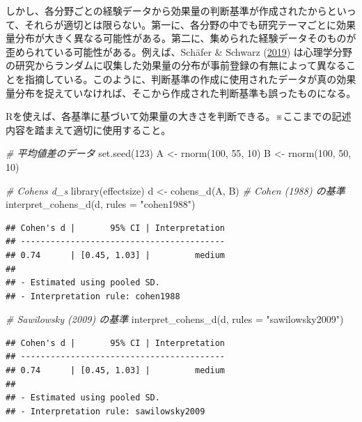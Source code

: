 \documentclass[
  ja=standard, xelatex, base=12pt]{bxjsreport}
\newenvironment{Shaded}{\begin{snugshade}}{\end{snugshade}}
\newcommand{\AttributeTok}[1]{\textcolor[rgb]{0.77,0.63,0.00}{#1}}
\newcommand{\CommentTok}[1]{\textcolor[rgb]{0.56,0.35,0.01}{\textit{#1}}}
\newcommand{\DecValTok}[1]{\textcolor[rgb]{0.00,0.00,0.81}{#1}}
\newcommand{\FunctionTok}[1]{\textcolor[rgb]{0.00,0.00,0.00}{#1}}
\newcommand{\NormalTok}[1]{#1}
\newcommand{\OtherTok}[1]{\textcolor[rgb]{0.56,0.35,0.01}{#1}}
\newcommand{\StringTok}[1]{\textcolor[rgb]{0.31,0.60,0.02}{#1}}
\begin{document}
しかし、各分野ごとの経験データから効果量の判断基準が作成されたからといって、それらが適切とは限らない。第一に、各分野の中でも研究テーマごとに効果量分布が大きく異なる可能性がある。第二に、集められた経験データそのものが歪められている可能性がある。例えば、Schäfer \& Schwarz (\protect\hyperlink{ref-schuxe4fer2019}{2019}) は心理学分野の研究からランダムに収集した効果量の分布が事前登録の有無によって異なることを指摘している。このように、判断基準の作成に使用されたデータが真の効果量分布を捉えていなければ、そこから作成された判断基準も誤ったものになる。

Rを使えば、各基準に基づいて効果量の大きさを判断できる。※ここまでの記述内容を踏まえて適切に使用すること。

\begin{Shaded}
\begin{Highlighting}[]
\CommentTok{\# 平均値差のデータ}
\FunctionTok{set.seed}\NormalTok{(}\DecValTok{123}\NormalTok{)}
\NormalTok{A }\OtherTok{\textless{}{-}} \FunctionTok{rnorm}\NormalTok{(}\DecValTok{100}\NormalTok{, }\DecValTok{55}\NormalTok{, }\DecValTok{10}\NormalTok{)}
\NormalTok{B }\OtherTok{\textless{}{-}} \FunctionTok{rnorm}\NormalTok{(}\DecValTok{100}\NormalTok{, }\DecValTok{50}\NormalTok{, }\DecValTok{10}\NormalTok{)}

\CommentTok{\# Cohen\textquotesingle{}s d\_s}
\FunctionTok{library}\NormalTok{(effectsize)}
\NormalTok{d }\OtherTok{\textless{}{-}} \FunctionTok{cohens\_d}\NormalTok{(A, B)}
\CommentTok{\# Cohen (1988) の基準}
\FunctionTok{interpret\_cohens\_d}\NormalTok{(d, }\AttributeTok{rules =} \StringTok{"cohen1988"}\NormalTok{)}
\end{Highlighting}
\end{Shaded}

\begin{verbatim}
## Cohen's d |       95% CI | Interpretation
## -----------------------------------------
## 0.74      | [0.45, 1.03] |         medium
## 
## - Estimated using pooled SD.
## - Interpretation rule: cohen1988
\end{verbatim}

\begin{Shaded}
\begin{Highlighting}[]
\CommentTok{\# Sawilowsky (2009) の基準}
\FunctionTok{interpret\_cohens\_d}\NormalTok{(d, }\AttributeTok{rules =} \StringTok{"sawilowsky2009"}\NormalTok{)}
\end{Highlighting}
\end{Shaded}

\begin{verbatim}
## Cohen's d |       95% CI | Interpretation
## -----------------------------------------
## 0.74      | [0.45, 1.03] |         medium
## 
## - Estimated using pooled SD.
## - Interpretation rule: sawilowsky2009
\end{verbatim}
\end{document}

